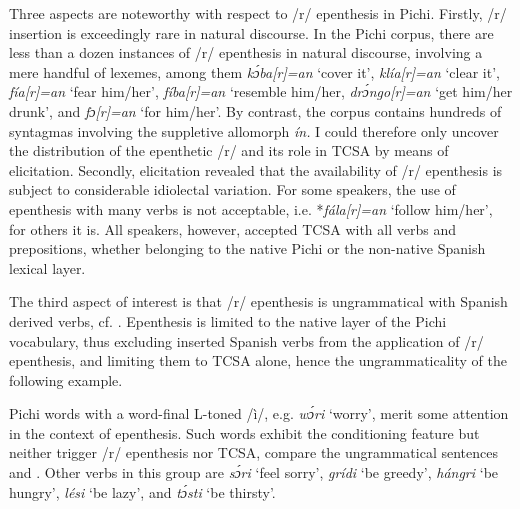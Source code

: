 Three aspects are noteworthy with respect to /r/ epenthesis in Pichi. Firstly, /r/ insertion is exceedingly rare in natural discourse. In the Pichi corpus, there are less than a dozen instances of /r/ epenthesis in natural discourse, involving a mere handful of lexemes, among them \textit{kɔ́ba[r]=an} ‘cover it’, \textit{klía[r]=an} ‘clear it’, \textit{fía[r]=an} ‘fear him/her’, \textit{fíba[r]=an} ‘resemble him/her, \textit{drɔ́ngo[r]=an} ‘get him/her drunk’, and \textit{fɔ[r]=an} ‘for him/her’. By contrast, the corpus contains hundreds of syntagmas involving the suppletive allomorph \textit{ín.} I could therefore only uncover the distribution of the epenthetic /r/ and its role in TCSA by means of elicitation. Secondly, elicitation revealed that the availability of /r/ epenthesis is subject to considerable idiolectal variation. For some speakers, the use of epenthesis with many verbs is not acceptable, i.e. *\textit{fála[r]=an} ‘follow him/her’, for others it is. All speakers, however, accepted TCSA with all verbs and prepositions, whether belonging to the native Pichi or the non-native Spanish lexical layer. 


The third aspect of interest is that /r/ epenthesis is ungrammatical with Spanish derived verbs, cf. . Epenthesis is limited to the native layer of the Pichi vocabulary, thus excluding inserted Spanish verbs from the application of /r/ epenthesis, and limiting them to TCSA alone, hence the ungrammaticality of the following example.



\z

Pichi words with a word-final L-toned /ì/, e.g. \textit{wɔ́ri} ‘worry’, merit some attention in the context of epenthesis. Such words exhibit the conditioning feature but neither trigger /r/ epenthesis nor TCSA, compare the ungrammatical sentences  and . Other verbs in this group are \textit{sɔ́ri} ‘feel sorry’, \textit{grídi} ‘be greedy’, \textit{hángri} ‘be hungry’, \textit{lési} ‘be lazy’, and \textit{tɔ́sti} ‘be thirsty’. 


\z


